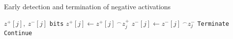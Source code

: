 \documentclass{article}
\begin{document}
\begin{algorithm}
\caption{Early detection and termination of negative activations}\label{alg:ENT}
\begin{algorithmic}[1]
\State $z^{+}[j],\ z^{-}[j] $ \texttt{bits}\;
    \State $z^{+}[j] \gets z^{+}[j]\ ^\frown z^{+}_{j}$\; 
    \State $z^{-}[j] \gets  z^{-}[j]\ ^\frown z^{-}_{j}$\;
        \State \texttt{Terminate}
    \Else
        \State \texttt{Continue}
    \EndIf
\EndFor
\end{algorithmic}
\end{algorithm}
\end{document}
